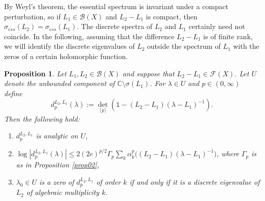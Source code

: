 \documentclass[12pt,a4paper]{article}
\newtheorem{prop}[theorem]{Proposition}
\theoremstyle{definition}
\theoremstyle{remark}
\numberwithin{equation}{section}
\newcommand{\mc}{{\mathbb C}}
\newcommand{\bdd}{\mathcal{B}}
\begin{document}
By Weyl's theorem, the essential spectrum is invariant under a compact perturbation, so if $L_1 \in \bdd(X)$ and $L_2-L_1$ is compact, then $\sigma_{ess}(L_2)=\sigma_{ess}(L_1)$. The discrete spectra of $L_2$ and $L_1$ certainly need not coincide. In the following, assuming that the difference $L_2-L_1$ is of finite rank, we will identify the discrete eigenvalues of $L_2$ outside the spectrum of $L_1$ with the zeros of a certain holomorphic function. 
\begin{prop}\label{prop03}
Let $L_1,L_2 \in \bdd(X)$ and suppose that $L_2-L_1 \in \mathcal{F}(X)$. Let $U$ denote the unbounded component of $\mc \setminus \sigma(L_1)$. For $\lambda \in U$ and $p \in (0,\infty)$ define 
\begin{equation}
  \label{eq:6}
  d_{p}^{L_2,L_1}(\lambda):= {\det}_{\lceil p \rceil}(\mathds{1}-(L_2-L_1)(\lambda-L_1)^{-1}).
\end{equation}
Then the following hold: 
\begin{enumerate}
    \item[(i)] $d_{p}^{L_2,L_1}$ is analytic on $U$,    
   \item[(ii)] $ \log |d_{p}^{L_2,L_1}(\lambda)| \leq  2(2e)^{p/2} \Gamma_p \sum_k \alpha_k^p\big((L_2-L_1)(\lambda - L_1)^{-1}\big)$, where $\Gamma_p$ is as in Proposition \ref{prop02},
  \item[(iii)] $\lambda_0 \in U$ is a zero of $d_{p}^{L_2,L_1}$ of order $k$ if and only if it is a discrete eigenvalue of $L_2$ of algebraic multiplicity $k$.
\end{enumerate}
\end{prop}
\end{document}
